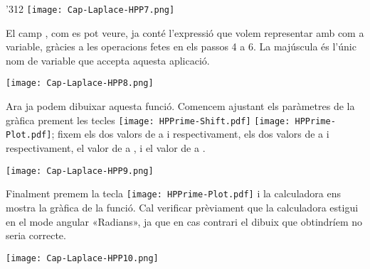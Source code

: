 \begin{exemple}
\begin{dingautolist}{'312}
            \texttt{[image: Cap-Laplace-HPP7.png]}\vspace{5mm}

          \item El camp  , com es pot veure, ja conté l'expressió que volem representar amb   com a variable, gràcies a les operacions fetes en els passos 4 a 6. La  majúscula és l'únic nom de variable que accepta aquesta aplicació.

            \texttt{[image: Cap-Laplace-HPP8.png]}\vspace{5mm}

          \item Ara ja podem dibuixar aquesta funció. Comencem ajustant els paràmetres de la gràfica prement les tecles \texttt{[image: HPPrime-Shift.pdf]} \texttt{[image: HPPrime-Plot.pdf]}; fixem els dos valors de  a  i  respectivament, els dos valors de  a  i  respectivament, el valor de  a , i el valor de  a .

            \texttt{[image: Cap-Laplace-HPP9.png]}\vspace{5mm}

          \item Finalment premem la tecla \texttt{[image: HPPrime-Plot.pdf]} i la calculadora ens mostra la gràfica de la funció. Cal verificar prèviament que la calculadora estigui en el mode angular «Radians», ja que en cas contrari el dibuix que obtindríem no seria correcte.

            \texttt{[image: Cap-Laplace-HPP10.png]}

    \end{dingautolist}

\end{exemple}
